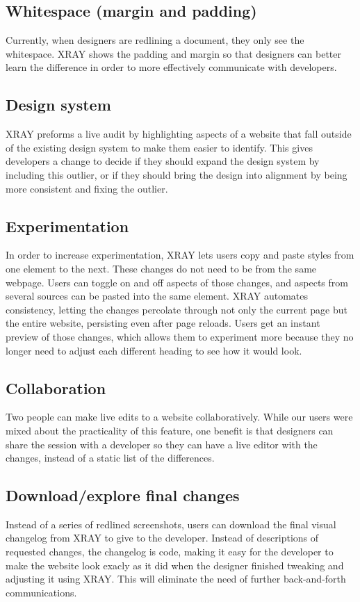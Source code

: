 \documentclass{sigchi}
\newcommand{\xray}{XRAY\xspace}
\begin{document}
\subsection{Whitespace (margin and padding)}
Currently, when designers are redlining a document, they only see the whitespace. \xray shows the padding and margin so that designers can better learn the difference in order to more effectively communicate with developers. 

\subsection{Design system}
\xray preforms a live audit by highlighting aspects of a website that fall outside of the existing design system to make them easier to identify. This gives developers a change to decide if they should expand the design system by including this outlier, or if they should bring the design into alignment by being more consistent and fixing the outlier. 

\subsection{Experimentation}
In order to increase experimentation, \xray lets users copy and paste styles from one element to the next. These changes do not need to be from the same webpage. Users can toggle on and off aspects of those changes, and aspects from several sources can be pasted into the same element. \xray automates consistency, letting the changes percolate through not only the current page but the entire website, persisting even after page reloads. Users get an instant preview of those changes, which allows them to experiment more because they no longer need to adjust each different heading to see how it would look. 

\subsection{Collaboration}
Two people can make live edits to a website collaboratively. While our users were mixed about the practicality of this feature, one benefit is that designers can share the session with a developer so they can have a live editor with the changes, instead of a static list of the differences. 

\subsection{Download/explore final changes}
Instead of a series of redlined screenshots, users can download the final visual changelog from \xray to give to the developer. Instead of descriptions of requested changes, the changelog is code, making it easy for the developer to make the website look exacly as it did when the designer finished tweaking and adjusting it using \xray. This will eliminate the need of further back-and-forth communications. 
\end{document}
